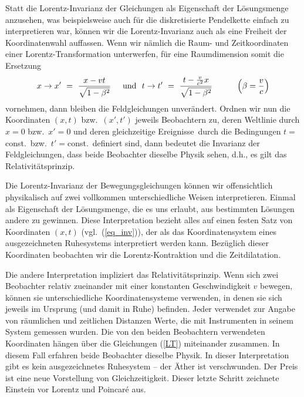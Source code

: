 Statt die Lorentz-Invarianz der Gleichungen als Eigenschaft der
L\"osungsmenge anzusehen, was beispielsweise auch f\"ur die diskretisierte
Pendelkette einfach zu interpretieren war, k\"onnen wir die 
Lorentz-Invarianz auch als eine Freiheit der Koordinatenwahl auffassen.
Wenn wir n\"amlich die Raum- und Zeitkoordinaten einer 
Lorentz-Transformation unterwerfen, f\"ur eine Raumdimension somit
die Ersetzung
\begin{equation}
\label{LT}
   x \rightarrow x' ~=~ \frac{x - vt}{\sqrt{1-\beta^2}}  
    \hspace{0.5cm} {\rm und} ~~
    t \rightarrow t' ~=~ \frac{t - \frac{v}{c^2}x}{\sqrt{1-\beta^2}}
    \hspace{1cm} \left(\beta = \frac{v}{c} \right)  
\end{equation}    
vornehmen,
dann bleiben die Feldgleichungen unver\"andert. Ordnen wir nun die
Koordinaten $(x,t)$ bzw.\ $(x',t')$ jeweils Beobachtern zu, deren Weltlinie 
durch $x=0$ bzw.\ $x'=0$ und deren 
\glqq gleichzeitige Ereignisse\grqq\ 
durch die Bedingungen $t=$const.\ bzw.\ $t'=$const.\ definiert sind,
dann bedeutet die Invarianz der Feldgleichungen, dass beide Beobachter
dieselbe Physik sehen, d.h., es gilt das Relativit\"atsprinzip.  

Die Lorentz-Invarianz der Bewegungsgleichungen k\"onnen wir
offensichtlich physikalisch auf zwei vollkommen unterschiedliche Weisen
interpretieren. Einmal als Eigenschaft der L\"osungsmenge, die es uns
erlaubt, aus bestimmten L\"osungen andere zu gewinnen. Diese 
Interpretation bezieht alles auf einen festen Satz von Koordinaten $(x,t)$
(vgl.~(\ref{eq_inv})), der als das Koordinatensystem eines ausgezeichneten
Ruhesystems interpretiert werden kann. Bez\"uglich dieser Koordinaten
beobachten wir die Lorentz-Kontraktion und die Zeitdilatation. 

Die andere Interpretation impliziert das Relativit\"atsprinzip. Wenn
sich zwei Beobachter relativ zueinander mit einer konstanten 
Geschwindigkeit $v$ bewegen, k\"onnen sie unterschiedliche
Koordinatensysteme verwenden, in denen sie sich jeweils im
Ursprung (und damit in Ruhe) befinden. Jeder verwendet zur
Angabe von r\"aumlichen und zeitlichen Distanzen Werte, die mit 
Instrumenten in seinem System gemessen wurden. 
Die von den beiden Beobachtern verwendeten 
Koordinaten h\"angen \"uber die Gleichungen
(\ref{LT}) miteinander zusammen. In diesem Fall erfahren beide
Beobachter dieselbe Physik. In dieser Interpretation gibt es kein
ausgezeichnetes Ruhesystem -- der \"Ather ist verschwunden. 
Der Preis ist eine neue Vorstellung von Gleichzeitigkeit. Dieser letzte
Schritt zeichnete Einstein vor Lorentz und Poincar\'e aus. 
      
